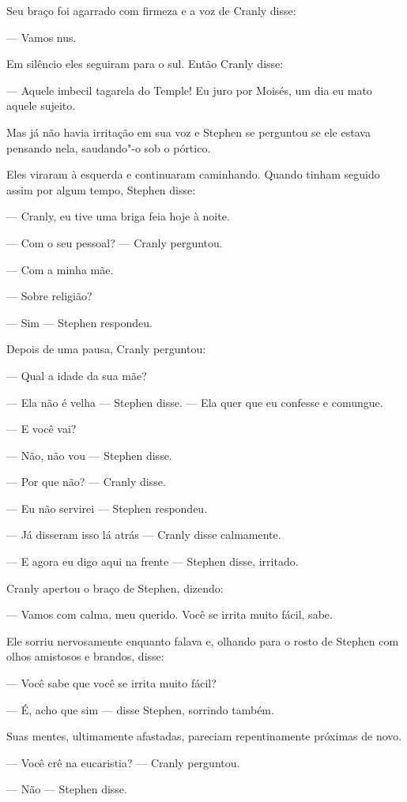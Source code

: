 Seu braço foi agarrado com firmeza e a voz de Cranly disse:

 --- Vamos nus.

Em silêncio eles seguiram para o sul. Então Cranly disse:

 --- Aquele imbecil tagarela do Temple! Eu juro por Moisés, um dia eu mato
aquele sujeito.

Mas já não havia irritação em sua voz e Stephen se perguntou se ele
estava pensando nela, saudando"-o sob o pórtico.

Eles viraram à esquerda e continuaram caminhando. Quando tinham seguido
assim por algum tempo, Stephen disse:

 --- Cranly, eu tive uma briga feia hoje à noite.

 --- Com o seu pessoal? --- Cranly perguntou.

 --- Com a minha mãe.

 --- Sobre religião?

 --- Sim --- Stephen respondeu.

Depois de uma pausa, Cranly perguntou:

 --- Qual a idade da sua mãe?

 --- Ela não é velha --- Stephen disse. --- Ela quer que eu confesse e comungue.

 --- E você vai?

 --- Não, não vou --- Stephen disse.

 --- Por que não? --- Cranly disse.

 --- Eu não servirei --- Stephen respondeu.

 --- Já disseram isso lá atrás --- Cranly disse calmamente.

 --- E agora eu digo aqui na frente --- Stephen disse, irritado.

Cranly apertou o braço de Stephen, dizendo:

 --- Vamos com calma, meu querido. Você se irrita muito fácil, sabe.

Ele sorriu nervosamente enquanto falava e, olhando para o rosto de
Stephen com olhos amistosos e brandos, disse:

 --- Você sabe que você se irrita muito fácil?

 --- É, acho que sim --- disse Stephen, sorrindo também.

Suas mentes, ultimamente afastadas, pareciam repentinamente próximas de
novo.

 --- Você crê na eucaristia? --- Cranly perguntou.

 --- Não --- Stephen disse.

